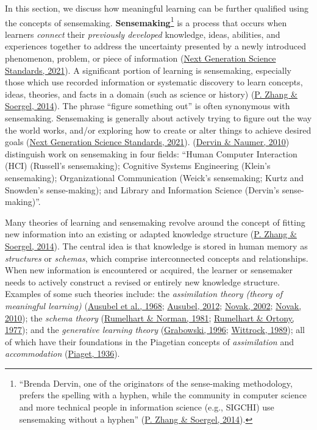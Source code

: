 \documentclass[letterpaper, nobind]{templates/ociamthesis}
\begin{document}
In this section, we discuss how meaningful learning can be further
qualified using the concepts of sensemaking.
\textbf{Sensemaking}\footnote{
  ``Brenda Dervin, one of the originators of the sense-making methodology, prefers the spelling with a hyphen, while the community in computer science and more technical people in information science (e.g., SIGCHI) use sensemaking without a hyphen'' (\protect\hyperlink{ref-zhang2014towards}{P. Zhang \& Soergel, 2014}).} is a
process that occurs when learners \emph{connect} their \emph{previously developed}
knowledge, ideas, abilities, and experiences together to address the
uncertainty presented by a newly introduced phenomenon, problem, or
piece of information (\protect\hyperlink{ref-ngss-sensemaking}{Next Generation Science Standards, 2021}). A significant portion of
learning is sensemaking, especially those which use recorded information
or systematic discovery to learn concepts, ideas, theories, and facts in
a domain (such as science or history) (\protect\hyperlink{ref-zhang2014towards}{P. Zhang \& Soergel, 2014}). The phrase
``figure something out'' is often synonymous with sensemaking. Sensemaking
is generally about actively trying to figure out the way the world
works, and/or exploring how to create or alter things to achieve desired
goals (\protect\hyperlink{ref-ngss-sensemaking}{Next Generation Science Standards, 2021}). (\protect\hyperlink{ref-dervin2010sensemaking}{Dervin \& Naumer, 2010}) distinguish work on
sensemaking in four fields: ``Human Computer Interaction (HCI) (Russell's
sensemaking); Cognitive Systems Engineering (Klein's sensemaking);
Organizational Communication (Weick's sensemaking; Kurtz and Snowden's
sense-making); and Library and Information Science (Dervin's
sense-making)''.

Many theories of learning and sensemaking revolve around the concept of
fitting new information into an existing or adapted knowledge structure
(\protect\hyperlink{ref-zhang2014towards}{P. Zhang \& Soergel, 2014}). The central idea is that knowledge is stored in
human memory as \emph{structures} or \emph{schemas}, which comprise interconnected
concepts and relationships. When new information is encountered or
acquired, the learner or sensemaker needs to actively construct a
revised or entirely new knowledge structure. Examples of some such
theories include: the \emph{assimilation theory (theory of meaningful
learning)}
(\protect\hyperlink{ref-ausubel1968educational}{Ausubel et al., 1968}; \protect\hyperlink{ref-ausubel2012acquisition}{Ausubel, 2012}; \protect\hyperlink{ref-novak2002meaningful}{Novak, 2002}; \protect\hyperlink{ref-novak2010learninga}{Novak, 2010});
the \emph{schema theory}
(\protect\hyperlink{ref-rumelhart1981accretion}{Rumelhart \& Norman, 1981}; \protect\hyperlink{ref-rumelhart1977representation}{Rumelhart \& Ortony, 1977}); and the
\emph{generative learning theory}
(\protect\hyperlink{ref-grabowski1996generative}{Grabowski, 1996}; \protect\hyperlink{ref-wittrock1989generative}{Wittrock, 1989}); all of which have
their foundations in the Piagetian concepts of \emph{assimilation} and
\emph{accommodation} (\protect\hyperlink{ref-piaget1936origins}{Piaget, 1936}).
\end{document}
